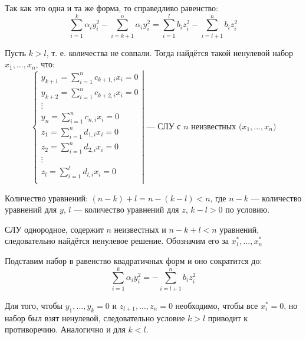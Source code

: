 \documentclass[12pt]{article}
\begin{document}
    Так как это одна и та же форма, то справедливо равенство:
    \[
        \sum^k_{i=1}\alpha_{i}y_i^2 - \sum^n_{i=k + 1}\alpha_{i}y_i^2 = \sum_{i=1}^lb_iz_i^2 - \sum_{i = l + 1}^nb_iz_i^2
    \]

    Пусть $k > l$, т. е. количества не совпали. Тогда найдётся такой ненулевой набор $x_1, ..., x_n$, что:
    \[
        \left.\begin{cases}
            y_{k + 1} = \sum_{i = 1}^{n}c_{k + 1,i}x_i = 0 \\
            y_{k + 2} = \sum_{i = 1}^{n}c_{k + 2,i}x_i = 0 \\
            \vdots                                         \\
            y_{n} = \sum_{i = 1}^{n}c_{n,i}x_i = 0         \\
            z_{1} = \sum_{i = 1}^{n}d_{1,i}x_i = 0         \\
            z_{2} = \sum_{i = 1}^{n}d_{2,i}x_i = 0         \\
            \vdots                                         \\
            z_{l} = \sum_{i = 1}^{l}d_{l,i}x_i = 0         \\
        \end{cases}\right|
        \text{ — СЛУ с $n$ неизвестных ($x_1, ..., x_n$)}
    \]

    Количество уравнений: $(n - k) + l = n - (k - l) < n$, где $n - k$ — количество уравнений для $y$, $l$ — количество уравнений для $z$, $k - l > 0$ по условию.

    СЛУ однородное, содержит $n$ неизвестных и $n - k + l < n$ уравнений, следовательно найдётся ненулевое решение. Обозначим его за $x_1^*, ..., x_n^*$

    Подставим набор в равенство квадратичных форм и оно сократится до:
    \[
        \sum^k_{i=1}\alpha_{i}y_i^2 = -\sum_{i = l + 1}^nb_iz_i^2
    \]

    Для того, чтобы $y_{1}, ..., y_k = 0$ и $z_{l + 1}, ..., z_n = 0$ необходимо, чтобы все $x_i^* = 0$, но набор был взят ненулевой, следовательно условие $k > l$ приводит к противоречию. Аналогично и для $k < l$.
\end{document}

